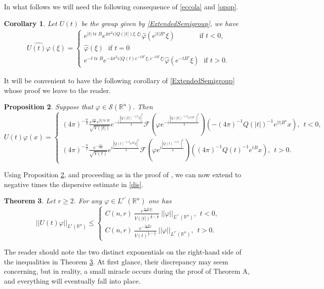 \documentclass[11pt,letter]{amsart}
\def \phi {\varphi}
\def \vf{\varphi}
\def \So {\mathscr{S}(\Rn)}
\newcommand{\Rn}{\mathbb R^n}
\numberwithin{equation}{section}
\newcommand{\tr}{\operatorname{tr}}
\newtheorem{theorem}{Theorem}[section]
\newtheorem{proposition}[theorem]{Proposition}
\newtheorem{corollary}[theorem]{Corollary}
\numberwithin{equation}{section}
\begin{document}
In what follows we will need the following consequence of \eqref{eccola} and \eqref{opop}. 
\begin{corollary}\label{C:eccopop}
Let $U(t)$ be the group given by \eqref{ExtendedSemigroup}, we have
\begin{align}\label{FTsemigrou}
\widehat{U(t)\phi}(\xi)=\begin{cases}
e^{|t| \tr B}e^{4\pi^{2}i\langle Q(|t|)\xi,\xi\rangle}\hat{\phi}(e^{|t|B^{\star}}\xi) \ \ \ \ \ \ \ \ \ \ \ \ \ \ \ \ \text{if }t<0,
\\
\hat{\phi}(\xi) \ \ \ \text{if }t=0
\\
e^{-t \tr B}e^{-4\pi^{2}i\langle Q(t)e^{-tB^{\star}}\xi, e^{-tB^{\star}}\xi\rangle}\hat{\phi}(e^{-tB^{\star}}\xi) \ \ \ \text{if }t>0.
\end{cases}
\end{align}
\end{corollary}

It will be convenient to have the following corollary of \eqref{ExtendedSemigroup} whose proof we leave to the reader.

\begin{proposition}\label{P:ft}
Suppose that $\vf\in \So$. Then 
\[
U(t) \vf(x) = 
\begin{cases}
(4\pi
)^{-\frac{n}{2}}  \frac{e^{\frac{i \pi n}4} e^{|t| \tr B}}{\sqrt{V(|t|)}} e^{-i \frac{|Q(|t|)^{-1/2} x|^2}{4}}\mathscr F\left(\vf e^{-i \frac{|Q(|t|)^{-1/2}e^{|t|B} \cdot|^2}{4}}\right)(-(4\pi)^{-1} Q(|t|)^{-1} e^{|t|B^\star} x),\ \ t<0,
\\
(4\pi
)^{-\frac{n}{2}}  \frac{e^{-\frac{i \pi n}4}}{\sqrt{V(t)}} e^{i \frac{|Q(t)^{-1/2} e^{tB} x|^2}{4}}\mathscr F\left(\vf e^{i \frac{|Q(t)^{-1/2} \cdot|^2}{4}}\right)((4\pi)^{-1} Q(t)^{-1} e^{tB} x),\ \ t>0.
\end{cases}
\]
\end{proposition}

Using Proposition \ref{P:ft}, and proceeding as in the proof of \cite[Theor.4.1]{GL}, we can now extend to negative times the dispersive estimate in \eqref{dis}.

\begin{theorem}\label{T:de}
Let $r\ge 2$. For any $\vf\in L^{r'}(\Rn)$ one has
\[
||U(t) \vf||_{L^{r}(\Rn)} \le 
\begin{cases}
C(n,r) \ \frac{e^{\frac{\tr B}{r'} |t|}}{V(|t|)^{\frac 12 - \frac 1{r}}}\ ||\vf||_{L^{r'}(\Rn)},\ \ t<0,
\\
C(n,r) \ \frac{e^{-\frac{\tr B}{r} t}}{V(t)^{\frac 12 - \frac 1{r}}}\ ||\vf||_{L^{r'}(\Rn)},\ \ t>0.
\end{cases}
\]
\end{theorem}
The reader should note the two distinct exponentials on the right-hand side of the inequalities in Theorem \ref{T:de}. At first glance, their discrepancy may seem concerning, but in reality, a small miracle occurs during the proof of Theorem A, and everything will eventually fall into place.
\end{document}
